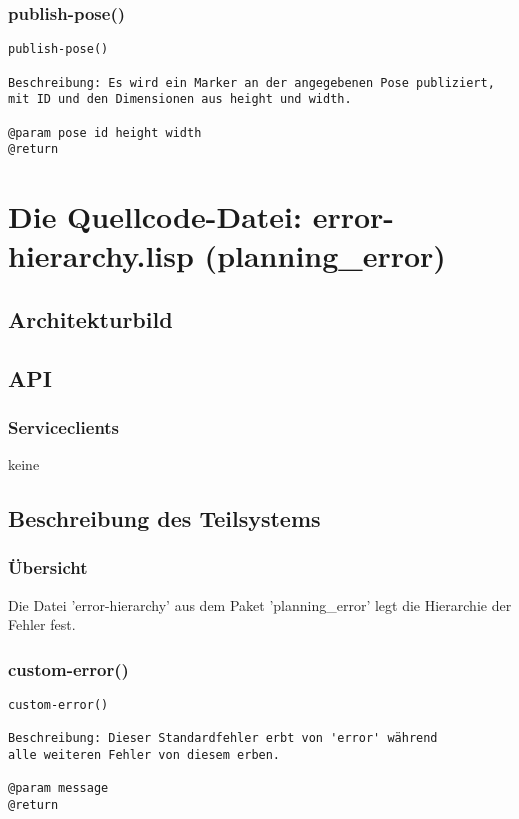 \documentclass{suturo}
\begin{document}
\subsubsection{publish-pose()}
\begin{verbatim}
publish-pose()

Beschreibung: Es wird ein Marker an der angegebenen Pose publiziert,
mit ID und den Dimensionen aus height und width.

@param pose id height width
@return 
\end{verbatim}

\section{Die Quellcode-Datei: error-hierarchy.lisp (planning\_error)}
\subsection{Architekturbild}
\begin{figure}[!htb]
\end{figure}


\subsection{API}
\subsubsection{Serviceclients}
keine
\subsection{Beschreibung des Teilsystems}
\subsubsection{\"Ubersicht}
Die Datei 'error-hierarchy' aus dem Paket 'planning\_error' legt die Hierarchie der Fehler fest.

\subsubsection{custom-error()}
\begin{verbatim}
custom-error()

Beschreibung: Dieser Standardfehler erbt von 'error' während
alle weiteren Fehler von diesem erben. 

@param message
@return 
\end{verbatim}
\end{document}
